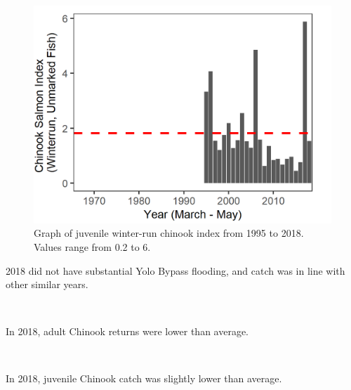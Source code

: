 \documentclass[
]{book}
\begin{document}
\begin{panel-grid}
\begin{columns-nocenter}
\begin{column800}
\begin{expand}
\begin{figure}
\includegraphics[width=15.25in]{figures/DJFMP_chinook_winterByLength_allyears} \caption{Graph of juvenile winter-run chinook index from 1995 to 2018. Values range from 0.2 to 6.}\label{fig:unnamed-chunk-37}
\end{figure}

\end{expand}

\end{column800}

\end{columns-nocenter}

\begin{columns-nocenter}

\begin{column800}

2018 did not have substantial Yolo Bypass flooding, and catch was in line with other similar years.

\end{column800}

\begin{column40}

~

\end{column40}

\begin{column800}

In 2018, adult Chinook returns were lower than average.

\end{column800}

\begin{column40}

~

\end{column40}

\begin{column800}

In 2018, juvenile Chinook catch was slightly lower than average.

\end{column800}

\end{columns-nocenter}

\end{panel-grid}
\end{document}
